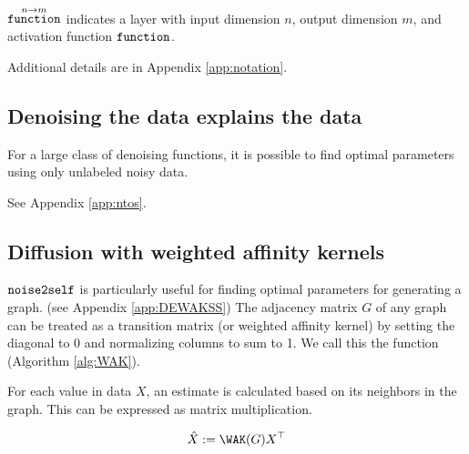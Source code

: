 $\mathop{\mathtt{function}}\limits^{n \to m}$ indicates a layer with input dimension $n$, output dimension $m$, and activation function $\mathop{\mathtt{function}}\limits$.

Additional details are in Appendix \ref{app:notation}.




\subsection{Denoising the data explains the data}
For a large class of denoising functions, it is possible to find optimal parameters using only unlabeled noisy data\cite{batson2019noise2self}.

See Appendix \ref{app:ntos}.

\subsection{Diffusion with weighted affinity kernels}

$\mathop{\mathtt{noise2self}}\limits$ is particularly useful for finding optimal parameters for generating a graph\cite{tjarnberg2021}.
(see Appendix \ref{app:DEWAKSS})
The adjacency matrix $G$ of any graph can be treated as a transition matrix (or weighted affinity kernel) by setting the diagonal to 0 and normalizing columns to sum to 1. We call this the \WAK function (Algorithm \ref{alg:WAK}).

For each value in data $X$, an estimate is calculated based on its neighbors in the graph. This can be expressed as matrix multiplication.

\begin{equation}
  \label{eq:WAK}
\hat{X} := \WAK(G)X^\top
\end{equation}


